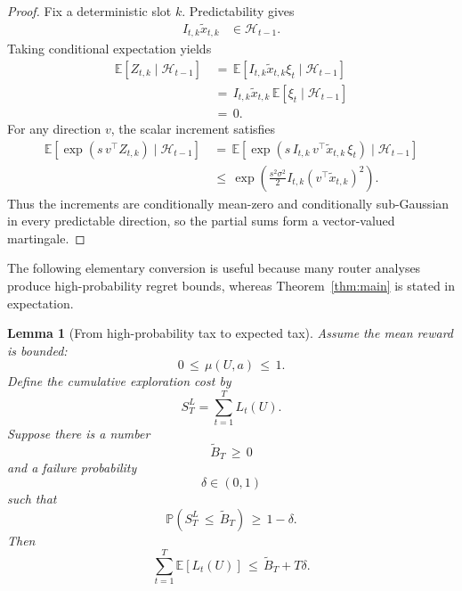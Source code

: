 \documentclass{article} %
\newtheorem{lemma}[theorem]{Lemma}
\begin{document}
\begin{proof}
Fix a deterministic slot \(k\). Predictability gives
\begin{align}
\label{eq:app-mart-predictable-product}
I_{t,k}\widetilde x_{t,k}
&\in
\mathcal{H}_{t-1}.
\end{align}
Taking conditional expectation yields
\begin{align}
\label{eq:app-mart-zero}
\mathbb{E}[Z_{t,k}\mid \mathcal{H}_{t-1}]
&\,=\,
\mathbb{E}\!\left[
I_{t,k}\widetilde x_{t,k}\xi_t
\mid
\mathcal{H}_{t-1}
\right]
\\
&\,=\,
I_{t,k}\widetilde x_{t,k}\,
\mathbb{E}[\xi_t\mid \mathcal{H}_{t-1}]
\\
&\,=\,
0.
\end{align}
For any direction \(v\), the scalar increment satisfies
\begin{align}
\label{eq:app-mart-subg-direction}
\mathbb{E}\!\left[
\exp\!\left(s\,v^\top Z_{t,k}\right)
\mid
\mathcal{H}_{t-1}
\right]
&\,=\,
\mathbb{E}\!\left[
\exp\!\left(
s\,I_{t,k}\,v^\top\widetilde x_{t,k}\,\xi_t
\right)
\mid
\mathcal{H}_{t-1}
\right]
\\
&\,\le\,
\exp\!\left(
\frac{s^2\sigma^2}{2}
I_{t,k}
(v^\top\widetilde x_{t,k})^2
\right).
\end{align}
Thus the increments are conditionally mean-zero and conditionally sub-Gaussian in every predictable direction, so the partial sums form a vector-valued martingale.
\end{proof}

The following elementary conversion is useful because many router analyses produce high-probability regret bounds, whereas Theorem~\ref{thm:main} is stated in expectation.

\begin{lemma}[From high-probability tax to expected tax]
\label{lem:4}
Assume the mean reward is bounded:
\begin{equation}
\label{eq:app-bounded-mean-for-tax}
0\,\le\, \mu(U,a)\,\le\, 1.
\end{equation}
Define the cumulative exploration cost by
\begin{equation}
\label{eq:app-cumulative-tax}
S_T^{L}
=
\sum_{t=1}^{T}L_t(U).
\end{equation}
Suppose there is a number
\begin{equation}
\label{eq:app-highprob-tax}
\widetilde{B}_T\,\ge\, 0
\end{equation}
and a failure probability
\begin{equation}
\label{eq:app-highprob-delta}
\delta\in(0,1)
\end{equation}
such that
\begin{equation}
\label{eq:app-highprob-tax-event}
\mathbb{P}\!\left(S_T^{L}\,\le\, \widetilde{B}_T\right)
\,\ge\,
1-\delta.
\end{equation}
Then
\begin{equation}
\label{eq:app-highprob-to-expectation}
\sum_{t=1}^{T}\mathbb{E}[L_t(U)]
\,\le\,
\widetilde{B}_T+T\delta.
\end{equation}
\end{lemma}
\end{document}
